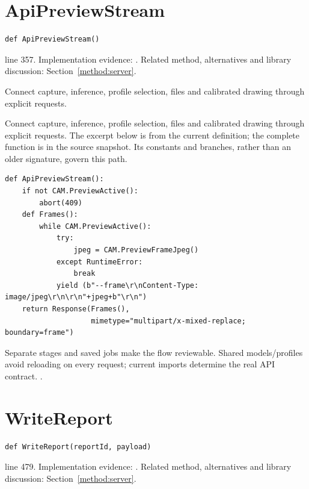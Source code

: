 \section{ApiPreviewStream}\label{fn:web-server:ApiPreviewStream}
\begin{lstlisting}[style=sig]
def ApiPreviewStream()
\end{lstlisting}
 line 357. Implementation evidence: \cite{code2026}. Related method, alternatives and library discussion: Section~\ref{method:server}.


Connect capture, inference, profile selection, files and calibrated drawing through explicit requests.


Connect capture, inference, profile selection, files and calibrated drawing through explicit requests. The excerpt below is from the current definition; the complete function is in the source snapshot. Its constants and branches, rather than an older signature, govern this path.


\begin{lstlisting}[style=plain]
def ApiPreviewStream():
    if not CAM.PreviewActive():
        abort(409)
    def Frames():
        while CAM.PreviewActive():
            try:
                jpeg = CAM.PreviewFrameJpeg()
            except RuntimeError:
                break
            yield (b"--frame\r\nContent-Type: image/jpeg\r\n\r\n"+jpeg+b"\r\n")
    return Response(Frames(),
                    mimetype="multipart/x-mixed-replace; boundary=frame")
\end{lstlisting}
Separate stages and saved jobs make the flow reviewable. Shared models/profiles avoid reloading on every request; current imports determine the real API contract. \cite{flaskdocs,pillowops,code2026}.


\section{WriteReport}\label{fn:web-server:WriteReport}
\begin{lstlisting}[style=sig]
def WriteReport(reportId, payload)
\end{lstlisting}
 line 479. Implementation evidence: \cite{code2026}. Related method, alternatives and library discussion: Section~\ref{method:server}.


